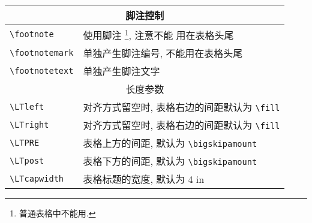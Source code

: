 \documentclass [nofonts]{ctexart}
\begin{document}
\begin{longtable}{|l|l|}
\hline
\multicolumn{2}{|c|}{脚注控制}	\\
\hline
\verb=\footnote=	& 使用脚注 \footnote{普通表格中不能用.}, 注意不能
	用在表格头尾	\\
\verb=\footnotemark=	& 单独产生脚注编号, 不能用在表格头尾	\\
\verb=\footnotetext=	& 单独产生脚注文字	\\
\hline
\multicolumn{2}{|c|}{长度参数}	\\
\hline
\verb=\LTleft=	& 对齐方式留空时, 表格右边的间距默认为 \verb=\fill=	\\
\verb=\LTright=	& 对齐方式留空时, 表格右边的间距默认为 \verb=\fill=	\\
\verb=\LTPRE=	& 表格上方的间距, 默认为 \verb=\bigskipamount=	\\
\verb=\LTpost=	& 表格下方的间距, 默认为 \verb=\bigskipamount=	\\
\verb=\LTcapwidth=	& 表格标题的宽度, 默认为 4 in \\
\end{longtable}
\end{document}
